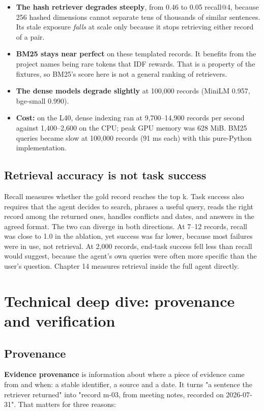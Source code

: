 \documentclass[10.5pt,a4paper,oneside]{report}
\begin{document}
\begin{itemize}
\item \textbf{The hash retriever degrades steeply}, from 0.46 to 0.05 recall@4, because 256 hashed dimensions cannot separate tens of thousands of similar sentences. Its stale exposure \emph{falls} at scale only because it stops retrieving either record of a pair.
\item \textbf{BM25 stays near perfect} on these templated records. It benefits from the project names being rare tokens that IDF rewards. That is a property of the fixtures, so BM25's score here is not a general ranking of retrievers.
\item \textbf{The dense models degrade slightly} at 100,000 records (MiniLM 0.957, bge-small 0.990).
\item \textbf{Cost:} on the L40, dense indexing ran at 9,700–14,900 records per second against 1,400–2,600 on the CPU; peak GPU memory was 628 MiB. BM25 queries became slow at 100,000 records (91 ms each) with this pure-Python implementation.
\end{itemize}
\section{Retrieval accuracy is not task success}
Recall measures whether the gold record reaches the top k. Task success also requires that the agent decides to search, phrases a useful query, reads the right record among the returned ones, handles conflicts and dates, and answers in the agreed format. The two can diverge in both directions. At 7–12 records, recall was close to 1.0 in the ablation, yet success was far lower, because most failures were in use, not retrieval. At 2,000 records, end-task success fell less than recall would suggest, because the agent's own queries were often more specific than the user's question. Chapter 14 measures retrieval inside the full agent directly.

\clearpage
\chapter{Technical deep dive: provenance and verification}
\section{Provenance}
\textbf{Evidence provenance} is information about where a piece of evidence came from and when: a stable identifier, a source and a date. It turns "a sentence the retriever returned" into "record m-03, from meeting notes, recorded on 2026-07-31". That matters for three reasons:
\end{document}
